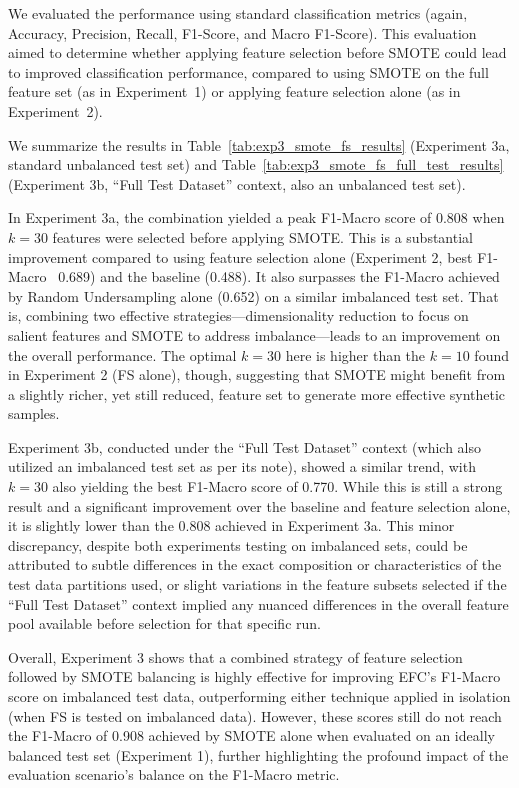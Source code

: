 \documentclass[12pt]{article}
\begin{document}
We evaluated the performance using standard classification metrics (again, Accuracy, Precision, Recall, F1-Score, and Macro
F1-Score). This evaluation aimed to determine whether applying feature selection before SMOTE could lead to improved classification
performance, compared to using SMOTE on the full feature set (as in Experiment~1) or applying feature selection alone (as in Experiment~2).

We summarize the results in Table~\ref{tab:exp3_smote_fs_results} (Experiment 3a, standard unbalanced test set) and
Table~\ref{tab:exp3_smote_fs_full_test_results} (Experiment 3b, ``Full Test Dataset'' context, also an unbalanced test set). 

In Experiment 3a, the combination yielded a peak F1-Macro score of 0.808 when $k=30$ features were selected before applying
SMOTE. This is a substantial improvement compared to using feature selection alone (Experiment 2, best F1-Macro ~0.689)
and the baseline (0.488). It also surpasses the F1-Macro achieved by Random Undersampling alone (0.652) on a similar imbalanced
test set. That is, combining two effective strategies---dimensionality reduction to focus on salient features and SMOTE to
address imbalance---leads to an improvement on the overall performance. The optimal $k=30$ here is higher than the $k=10$
found in Experiment 2 (FS alone), though, suggesting that SMOTE might benefit from a slightly richer, yet still reduced, feature
set to generate more effective synthetic samples. 

Experiment 3b, conducted under the ``Full Test Dataset'' context (which also utilized an imbalanced test set as per its
note), showed a similar trend, with $k=30$ also yielding the best F1-Macro score of 0.770. While this is still a strong
result and a significant improvement over the baseline and feature selection alone, it is slightly lower than the 0.808
achieved in Experiment 3a. This minor discrepancy, despite both experiments testing on imbalanced sets, could be attributed
to subtle differences in the exact composition or characteristics of the test data partitions used, or slight variations
in the feature subsets selected if the ``Full Test Dataset'' context implied any nuanced differences in the overall feature
pool available before selection for that specific run.

Overall, Experiment 3 shows that a combined strategy of feature selection followed by SMOTE balancing is highly
effective for improving EFC's F1-Macro score on imbalanced test data, outperforming either technique applied in isolation
(when FS is tested on imbalanced data). However, these scores still do not reach the F1-Macro of 0.908 achieved by SMOTE
alone when evaluated on an ideally balanced test set (Experiment 1), further highlighting the profound impact of the
evaluation scenario's balance on the F1-Macro metric.
\end{document}
